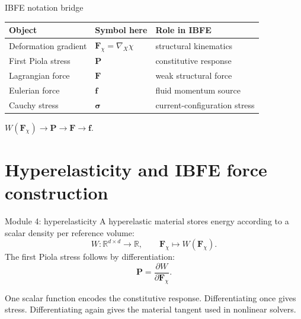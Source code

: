 \documentclass[aspectratio=169,11pt]{beamer}
\newcommand{\R}{\mathbb{R}}
\newcommand{\Fdef}{\bm{F}_{\chi}}
\newcommand{\sigmaC}{\bm{\sigma}}
\newcommand{\Pten}{\bm{P}}
\newcommand{\FLag}{\bm{F}}
\newcommand{\fEuler}{\bm{f}}
\newcommand{\gradX}{\nabla_{\!X}}
\begin{document}
\begin{frame}{IBFE notation bridge}
\small
\begin{center}
\renewcommand{\arraystretch}{1.2}
\begin{tabular}{lll}
\toprule
Object & Symbol here & Role in IBFE \\
\midrule
Deformation gradient & \(\Fdef=\gradX\chi\) & structural kinematics \\
First Piola stress & \(\Pten\) & constitutive response \\
Lagrangian force & \(\FLag\) & weak structural force \\
Eulerian force & \(\fEuler\) & fluid momentum source \\
Cauchy stress & \(\sigmaC\) & current-configuration stress \\
\bottomrule
\end{tabular}
\end{center}
\medskip
\begin{punchbox}
\centering
\(\displaystyle
  W(\Fdef)
  \longrightarrow
  \Pten
  \longrightarrow
  \FLag
  \longrightarrow
  \fEuler .
\)
\end{punchbox}
\end{frame}

\section{Hyperelasticity and IBFE force construction}

\begin{frame}{Module 4: hyperelasticity}
A hyperelastic material stores energy according to a scalar density per reference volume:
\[
  W:\R^{d\times d}\to\R,
  \qquad
  \Fdef\mapsto W(\Fdef).
\]
The first Piola stress follows by differentiation:
\[
  \boxed{
  \Pten=\frac{\partial W}{\partial\Fdef}
  }.
\]
\begin{punchbox}
\small
One scalar function encodes the constitutive response. Differentiating once gives stress. Differentiating again gives the material tangent used in nonlinear solvers.
\end{punchbox}
\end{frame}
\end{document}
